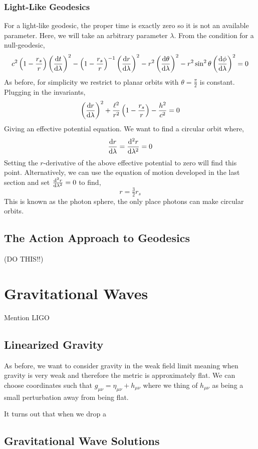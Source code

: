 \documentclass[11pt, a4paper]{article}
\begin{document}
\subsubsection{Light-Like Geodesics}

For a light-like geodesic, the proper time is exactly zero so it is not an available parameter. Here, we will take an arbitrary parameter $\lambda$. From the condition for a null-geodesic,
\[ c^2 \left(1 - \frac{r_s}{r} \right) \left( \frac{\mathrm{d}t}{\mathrm{d}\lambda} \right)^2 - \left(1 - \frac{r_s}{r} \right)^{-1} \left( \frac{\mathrm{d}r}{\mathrm{d}\lambda} \right)^2 - r^2 \left( \frac{\mathrm{d}\theta}{\mathrm{d}\lambda} \right)^2 - r^2 \sin^2{\theta} \left( \frac{\mathrm{d}\phi}{\mathrm{d}\lambda} \right)^2 = 0 \]
As before, for simplicity we restrict to planar orbits with $\theta = \frac{\pi}{2}$ is constant. Plugging in the invariants,
\[ \left( \frac{\mathrm{d}r}{\mathrm{d}\lambda} \right)^2 + \frac{\ell^2}{r^2} \left(1 - \frac{r_s}{r} \right) - \frac{h^2}{c^2}  = 0 \]
Giving an effective potential equation.
We want to find a circular orbit where,
\[ \frac{\mathrm{d}r}{\mathrm{d}\lambda} = \frac{\mathrm{d}^{2} r}{\mathrm{d}\lambda^{2}} = 0 \]
Setting the $r$-derivative of the above effective potential to zero will find this point. Alternatively, we can use the equation of motion developed in the last section and set $\frac{\mathrm{d}^{2} r}{\mathrm{d}\lambda^{2}} = 0$ to find,
\[ r = \tfrac{3}{2} r_s \]
This is known as the photon sphere, the only place photons can make circular orbits.
 
\subsection{The Action Approach to Geodesics}

(DO THIS!!)

\section{Gravitational Waves}
Mention LIGO

\subsection{Linearized Gravity}

As before, we want to consider gravity in the weak field limit meaning when gravity is very weak and therefore the metric is approximately flat. We can choose coordinates such that $g_{\mu \nu} = \eta_{\mu \nu} + h_{\mu \nu}$ where we thing of $h_{\mu \nu}$ as being a small perturbation away from being flat. 

It turns out that when we drop a

\subsection{Gravitational Wave Solutions}
\end{document}
